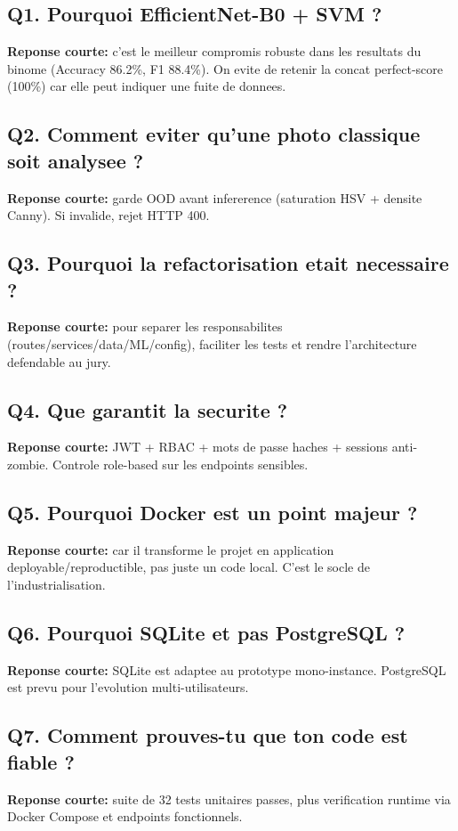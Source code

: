\documentclass[12pt,a4paper]{article}
\begin{document}
\subsection{Q1. Pourquoi EfficientNet-B0 + SVM ?}
\textbf{Reponse courte:} c'est le meilleur compromis robuste dans les resultats du binome (Accuracy 86.2\%, F1 88.4\%). On evite de retenir la concat perfect-score (100\%) car elle peut indiquer une fuite de donnees.

\subsection{Q2. Comment eviter qu'une photo classique soit analysee ?}
\textbf{Reponse courte:} garde OOD avant infererence (saturation HSV + densite Canny). Si invalide, rejet HTTP 400.

\subsection{Q3. Pourquoi la refactorisation etait necessaire ?}
\textbf{Reponse courte:} pour separer les responsabilites (routes/services/data/ML/config), faciliter les tests et rendre l'architecture defendable au jury.

\subsection{Q4. Que garantit la securite ?}
\textbf{Reponse courte:} JWT + RBAC + mots de passe haches + sessions anti-zombie. Controle role-based sur les endpoints sensibles.

\subsection{Q5. Pourquoi Docker est un point majeur ?}
\textbf{Reponse courte:} car il transforme le projet en application deployable/reproductible, pas juste un code local. C'est le socle de l'industrialisation.

\subsection{Q6. Pourquoi SQLite et pas PostgreSQL ?}
\textbf{Reponse courte:} SQLite est adaptee au prototype mono-instance. PostgreSQL est prevu pour l'evolution multi-utilisateurs.

\subsection{Q7. Comment prouves-tu que ton code est fiable ?}
\textbf{Reponse courte:} suite de 32 tests unitaires passes, plus verification runtime via Docker Compose et endpoints fonctionnels.
\end{document}
